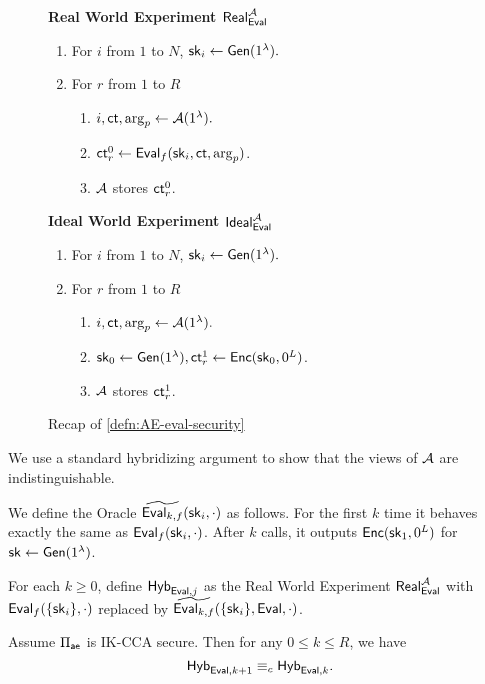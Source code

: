 \begin{figure}[h!]
\begin{framed}
\textbf{Real World Experiment $\mathsf{Real}^{\mathcal{A}}_{\mathsf{Eval}}$}
\begin{enumerate}
    \item For $i$ from $1$ to $N$, ${\mathsf{sk}}_i \leftarrow \mathsf{Gen}(1^{\lambda}).$
    \item For $r$ from $1$ to $R$
    \begin{enumerate}
        \item $i, \mathsf{ct}, \arg_p \leftarrow \mathcal{A}(1^{\lambda}).$
        \item $\mathsf{ct}^{0}_r \leftarrow \mathsf{Eval}_f({\mathsf{sk}}_i, \mathsf{ct}, \arg_p)$.
        \item $\mathcal{A}$ stores $\mathsf{ct}^{0}_r$.
    \end{enumerate}
\end{enumerate}
\textbf{Ideal World Experiment $\mathsf{Ideal}^{\mathcal{A}}_{\mathsf{Eval}}$}
\begin{enumerate}
    \item For $i$ from $1$ to $N$, ${\mathsf{sk}}_i \leftarrow \mathsf{Gen}(1^{\lambda}).$
    \item For $r$ from $1$ to $R$
    \begin{enumerate}
        \item $i, \mathsf{ct}, \arg_p \leftarrow \mathcal{A}(1^{\lambda}).$
        \item ${\mathsf{sk}}_0 \leftarrow \mathsf{Gen}(1^{\lambda}), \mathsf{ct}^{1}_r \leftarrow \mathsf{Enc}({\mathsf{sk}}_0, 0^L)$.
        \item $\mathcal{A}$ stores $\mathsf{ct}^{1}_r$.
    \end{enumerate}
\end{enumerate}
\end{framed}
\caption{Recap of \cref{defn:AE-eval-security}}
\end{figure}
We use a standard hybridizing argument to show that the views of $\mathcal{A}$ are indistinguishable. 
\begin{definition}
We define the Oracle $\widetilde{\mathsf{Eval}_{k, f}}({\mathsf{sk}}_i, \cdot)$ as follows. For the first $k$ time it behaves exactly the same as $\mathsf{Eval}_f({\mathsf{sk}}_i, \cdot)$. After $k$ calls, it outputs $\mathsf{Enc}({\mathsf{sk}}_1, 0^L)$ for ${\mathsf{sk}} \leftarrow \mathsf{Gen}(1^{\lambda})$.

For each $k \geq 0$, define $\mathsf{Hyb}_{\mathsf{Eval}, j}$ as the Real World Experiment $\mathsf{Real}_{\mathsf{Eval}}^{\mathcal{A}}$ with $\mathsf{Eval}_f(\{{\mathsf{sk}}_i\}, \cdot)$ replaced by $\widetilde{\mathsf{Eval}_{k, f}}(\{{\mathsf{sk}}_i\}, \mathsf{Eval}, \cdot)$. 
\end{definition}
\begin{lemma}
     Assume $\Pi_{\mathsf{ae}}$ is IK-CCA secure. Then for any $0 \leq k \leq R$, we have 
    $$\mathsf{Hyb}_{\mathsf{Eval}, k + 1} \equiv_c \mathsf{Hyb}_{\mathsf{Eval}, k}.$$
\end{lemma}
